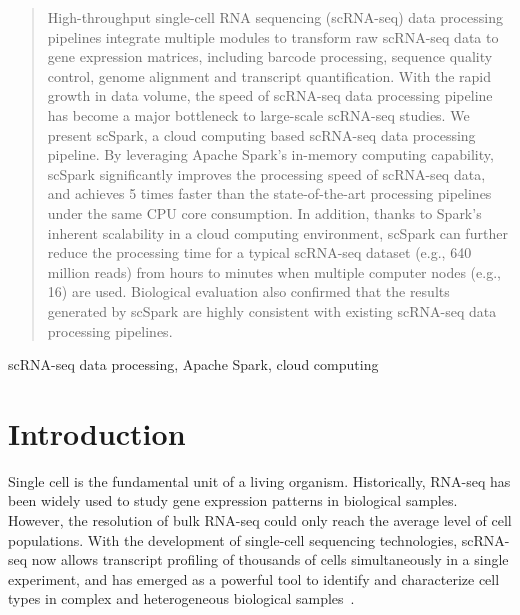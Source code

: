 \documentclass[conference]{IEEEtran}
\begin{document}
\begin{abstract}

High-throughput single-cell RNA sequencing (scRNA-seq) data processing pipelines integrate multiple modules to transform raw scRNA-seq data to gene expression matrices, including barcode processing, sequence quality control, genome alignment and transcript quantification.
With the rapid growth in data volume, the speed of scRNA-seq data processing pipeline has become a major bottleneck to large-scale scRNA-seq studies. 
We present scSpark, a cloud computing based scRNA-seq data processing pipeline. 
By leveraging Apache Spark's in-memory computing capability, scSpark significantly improves the processing speed of scRNA-seq data, and achieves 5 times faster than the state-of-the-art processing pipelines under the same CPU core consumption.
In addition, thanks to Spark's inherent scalability in a cloud computing environment, scSpark can further reduce the processing time for a typical scRNA-seq dataset (e.g., 640 million reads) from hours to minutes when multiple computer nodes (e.g., 16) are used.  
Biological evaluation also confirmed that the results generated by scSpark are highly consistent with existing scRNA-seq data processing pipelines.
\end{abstract}

\begin{IEEEkeywords}
scRNA-seq data processing, Apache Spark, cloud computing
\end{IEEEkeywords}

\section{Introduction}
Single cell is the fundamental unit of a living organism.
Historically, RNA-seq has been widely used to study gene expression patterns in biological samples.
However, the resolution of bulk RNA-seq could only reach the average level of cell populations. 
With the development of single-cell sequencing technologies, scRNA-seq now allows transcript profiling of thousands of cells simultaneously in a single experiment, and has emerged as a powerful tool to identify and characterize cell types in complex and heterogeneous biological samples~\cite{Zhang2019ComparativeAO}.
\end{document}
